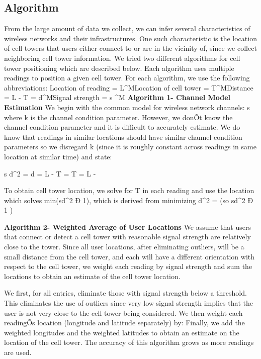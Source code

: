 \subsection{Algorithm}
\label{ss:algorithm}
From the large amount of data we collect, we can infer several characteristics of
wireless networks and their infrastructures. One such characteristic is the location
of cell towers that users either connect to or are in the vicinity of, since we collect
neighboring cell tower information. We tried two different algorithms for cell tower
positioning which are described below. Each algorithm uses multiple readings to
position a given cell tower. For each algorithm, we use the following abbreviations:
Location of reading = L^MLocation of cell tower = T^MDistance = L - T = d^MSignal strength = s
^M
{\bfseries Algorithm 1- Channel Model Estimation}
We begin with the common model for wireless network channels: s \propto {}
where k is the channel condition parameter. However, we donÕt know the channel
condition parameter and it is difficult to accurately estimate. We do know that readings
in similar locations should have similar channel condition parameters so we disregard
k (since it is roughly constant across readings in same location at similar time) and state:

s \propto {} \rightarrow d^2 =  \rightarrow d =  \rightarrow L - T =  \rightarrow T = L - 

To obtain cell tower location, we solve for T in each reading and use the location which solves
min(sd^2 Ð 1), which is derived from minimizing d^2 =  (so sd^2 Ð 1 )


{\bfseries Algorithm 2- Weighted Average of User Locations}
We assume that users that connect or detect a cell tower with reasonable signal strength
are relatively close to the tower. Since all user locations, after eliminating outliers, will be
a small distance from the cell tower, and each will have a different orientation with respect
to the cell tower, we weight each reading by signal strength and sum the locations to obtain
an estimate of the cell tower location.

We first, for all entries, eliminate those with signal strength below a threshold. This eliminates
the use of outliers since very low signal strength implies that the user is not very close to the
cell tower being considered. We then weight each readingÕs location (longitude and latitude separately) by:
Finally, we add the weighted longitudes and the weighted latitudes to obtain an estimate on the location
of the cell tower. The accuracy of this algorithm grows as more readings are used.


